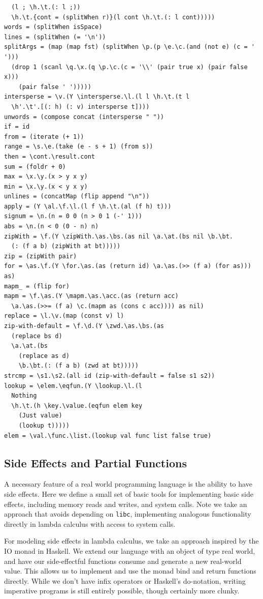 \begin{verbatim}
  (l ; \h.\t.(: l ;))
  \h.\t.{cont = (splitWhen r)}(l cont \h.\t.(: l cont)))))
words = (splitWhen isSpace)
lines = (splitWhen (= '\n'))
splitArgs = (map (map fst) (splitWhen \p.(p \e.\c.(and (not e) (c = ' '))) 
  (drop 1 (scanl \q.\x.(q \p.\c.(c = '\\' (pair true x) (pair false x))) 
    (pair false ' ')))))
intersperse = \v.(Y \intersperse.\l.(l l \h.\t.(t l 
  \h'.\t'.[(: h) (: v) intersperse t])))
unwords = (compose concat (intersperse " "))
if = id
from = (iterate (+ 1))
range = \s.\e.(take (e - s + 1) (from s))
then = \cont.\result.cont
sum = (foldr + 0)
max = \x.\y.(x > y x y)
min = \x.\y.(x < y x y)
unlines = (concatMap (flip append "\n"))
apply = (Y \al.\f.\l.(l f \h.\t.(al (f h) t))) 
signum = \n.(n = 0 0 (n > 0 1 (-' 1)))
abs = \n.(n < 0 (0 - n) n)
zipWith = \f.(Y \zipWith.\as.\bs.(as nil \a.\at.(bs nil \b.\bt.
  (: (f a b) (zipWith at bt)))))
zip = (zipWith pair)
for = \as.\f.(Y \for.\as.(as (return id) \a.\as.(>> (f a) (for as))) as)
mapm_ = (flip for)
mapm = \f.\as.(Y \mapm.\as.\acc.(as (return acc) 
  \a.\as.(>>= (f a) \c.(mapm as (cons c acc)))) as nil)
replace = \l.\v.(map (const v) l)
zip-with-default = \f.\d.(Y \zwd.\as.\bs.(as 
  (replace bs d)
  \a.\at.(bs 
    (replace as d)
    \b.\bt.(: (f a b) (zwd at bt)))))
strcmp = \s1.\s2.(all id (zip-with-default = false s1 s2))
lookup = \elem.\eqfun.(Y \lookup.\l.(l 
  Nothing 
  \h.\t.(h \key.\value.(eqfun elem key
    (Just value)
    (lookup t)))))
elem = \val.\func.\list.(lookup val func list false true)
\end{verbatim}

\subsection{Side Effects and Partial Functions}
A necessary feature of a real world programming language is the ability to have
side effects. Here we define a small set of basic tools for implementing basic
side effects, including memory reads and writes, and system calls. Note we take
an approach that avoids depending on \texttt{libc}, implementing analogous
functionality directly in lambda calculus with access to system calls. 

For modeling side effects in lambda calculus, we take an approach inspired by
the IO monad in Haskell. We extend our language with an object of type real
world, and have our side-effectful functions consume and generate a new
real-world value. This allows us to implement and use the monad bind and return
functions directly. While we don't have infix operators or Haskell's
do-notation, writing imperative programs is still entirely possible, though
certainly more clunky. 

